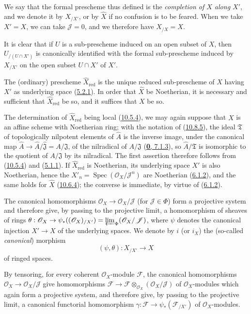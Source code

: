 We say that the formal prescheme thus defined is the
\emph{completion of $X$ along $X'$}, and we denote it by $X_{/X'}$, or by
$\widehat X$ if no confusion is to be feared. When we take
$X'=X$, we can take $\mathscr{J}=0$, and we therefore have $X_{/X}=X$.

It is clear that if $U$ is a sub-prescheme induced on an open subset of
$X$, then $U_{/(U\cap X')}$ is canonically identified with the formal
sub-prescheme induced by $X_{/X'}$ on the open subset $U\cap X'$ of $X'$.

\begin{corollary}[10.8.6]
\label{I.10.8.6}
The (ordinary) prescheme $\widehat X_{\mathrm{red}}$ is the unique
reduced sub-prescheme of $X$ having $X'$ as underlying space
\textup{(\hyperref[I.5.2.1]{5.2.1})}. In order that $\widehat X$ be Noetherian,
it is necessary and sufficient that $\widehat X_{\mathrm{red}}$ be so,
and it suffices that $X$ be so.
\end{corollary}


The determination of $\widehat X_{\mathrm{red}}$ being local
(\hyperref[I.10.5.4]{10.5.4}), we may again suppose that $X$ is an
affine scheme with Noetherian ring; with the notation of
(\hyperref[I.10.8.5]{10.8.5}), the ideal $\mathfrak{T}$ of
topologically nilpotent elements of $\widehat A$ is the inverse image,
under the canonical map
$\widehat A\to\widehat A/\widehat{\mathfrak{J}}=A/\mathfrak{J}$, of the
nilradical of $A/\mathfrak{J}$
(\hyperref[0.7.1.3]{\textbf{0}, 7.1.3}), so $\widehat A/\mathfrak{T}$ is
isomorphic to the quotient of $A/\mathfrak{J}$ by its nilradical. The
first assertion therefore follows from (\hyperref[I.10.5.4]{10.5.4})
and (\hyperref[I.5.1.1]{5.1.1}). If $\widehat X_{\mathrm{red}}$ is
Noetherian, its underlying space $X'$ is also Noetherian, hence the
$X'_n=\operatorname{Spec}(\mathscr{O}_X/\mathscr{J}^n)$ are Noetherian
(\hyperref[I.6.1.2]{6.1.2}), and the same holds for $\widehat X$
(\hyperref[I.10.6.4]{10.6.4}); the converse is immediate, by virtue
of (\hyperref[I.6.1.2]{6.1.2}).

\begin{env}[10.8.7]
\label{I.10.8.7}
The canonical homomorphisms
$\mathscr{O}_X\to\mathscr{O}_X/\mathscr{J}$ (for
$\mathscr{J}\in\Phi$) form a projective system and therefore give, by
passing to the projective limit, a homomorphism of sheaves of rings
$\theta:\mathscr{O}_X\to\psi_*((\mathscr{O}_X)_{/X'})
=\varprojlim_\Phi(\mathscr{O}_X/\mathscr{J})$, where $\psi$ denotes
the canonical injection $X'\to X$ of the underlying spaces. We denote
by $i$ (or $i_X$) the (so-called \emph{canonical}) morphism
\[
  (\psi,\theta):X_{/X'}\to X
\]
of ringed spaces.

By tensoring, for every coherent $\mathscr{O}_X$-module
$\mathscr{F}$, the canonical homomorphisms
$\mathscr{O}_X\to\mathscr{O}_X/\mathscr{J}$ give homomorphisms
$\mathscr{F}\to
\mathscr{F}\otimes_{\mathscr{O}_X}(\mathscr{O}_X/\mathscr{J})$ of
$\mathscr{O}_X$-modules which again form a projective system, and
therefore give, by passing to the projective limit, a canonical
functorial homomorphism
$\gamma:\mathscr{F}\to\psi_*(\mathscr{F}_{/X'})$ of
$\mathscr{O}_X$-modules.
\end{env}

